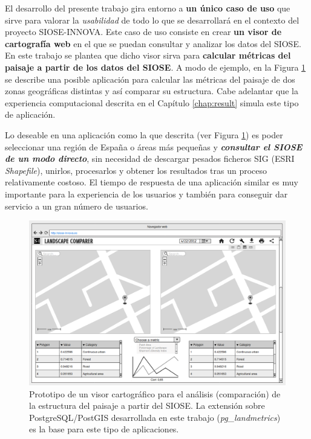 \begin{prologo}
El desarrollo del presente trabajo gira entorno a \textbf{un único caso de uso} que sirve para valorar la \textit{usabilidad} de todo lo que se desarrollará en el contexto del proyecto SIOSE-INNOVA. Este caso de uso consiste en crear \textbf{un visor de cartografía web} en el que se puedan consultar y analizar los datos del SIOSE. En este trabajo se plantea que dicho visor sirva para \textbf{calcular métricas del paisaje a partir de los datos del SIOSE}. A modo de ejemplo, en la Figura \ref{fig:visorweb} se describe una posible aplicación para calcular las métricas del paisaje de dos zonas geográficas distintas y así comparar su estructura. Cabe adelantar que la experiencia computacional descrita en el Capítulo \ref{chap:result} simula este tipo de aplicación.

Lo deseable en una aplicación como la que descrita (ver Figura \ref{fig:visorweb}) es poder seleccionar una región de España o áreas más pequeñas y \textbf{\textit{consultar el SIOSE de un modo directo}}, sin necesidad de descargar pesados ficheros SIG (ESRI \textit{Shapefile}), unirlos, procesarlos y obtener los resultados tras un proceso relativamente costoso. El tiempo de respuesta de una aplicación similar es muy importante para la experiencia de los usuarios y también para conseguir dar servicio a un gran número de usuarios.

\begin{figure}
\begin{center}
\includegraphics[width=\textwidth]{Prologo/Figs/visorweb.png}
\caption{Prototipo de un visor cartográfico para el análisis (comparación) de la estructura del paisaje a partir del SIOSE. La extensión sobre PostgreSQL/PostGIS desarrollada en este trabajo (\textit{pg\_landmetrics}) es la base para este tipo de aplicaciones. \label{fig:visorweb}}
\end{center}
\end{figure}


\end{prologo}
